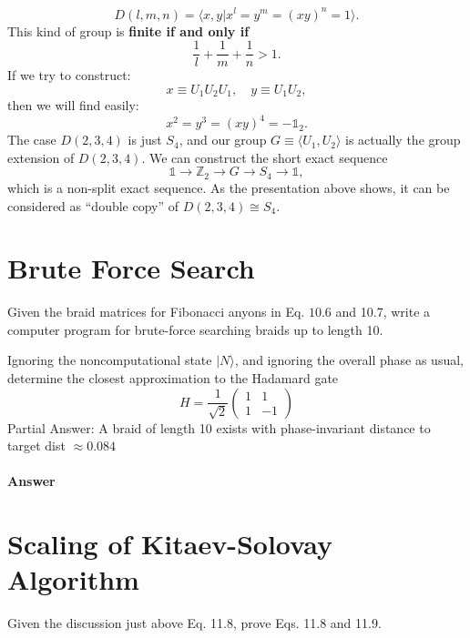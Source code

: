 \documentclass{book}
\begin{document}
\begin{equation*}
D( l,m,n) =\langle x,y|x^{l} =y^{m} =(xy )^{n} =1\rangle .
\end{equation*}
This kind of group is \textbf{finite if and only if}
\begin{equation*}
\frac{1}{l} +\frac{1}{m} +\frac{1}{n}  >1.
\end{equation*}
If we try to construct:
\begin{equation*}
x\equiv U_{1} U_{2} U_{1} ,\quad y\equiv U_{1} U_{2} ,
\end{equation*}
then we will find easily:
\begin{equation*}
x^{2} =y^{3} =( xy)^{4} =-\mathds{1}_{2} .
\end{equation*}
The case $D( 2,3,4)$ is just $S_{4}$, and our group $G\equiv \langle U_{1} ,U_{2} \rangle $ is actually the group extension of $D( 2,3,4)$. We can construct the short exact sequence
\begin{equation*}
\mathds{1}\rightarrow \mathbb{Z}_{2}\rightarrow G\rightarrow S_{4}\rightarrow \mathds{1} ,
\end{equation*}
which is a non-split exact sequence. As the presentation above shows, it can be considered as ``double copy'' of $D( 2,3,4) \cong S_{4}$. 

\section{Brute Force Search}
Given the braid matrices for Fibonacci anyons in Eq. $10.6$ and 10.7, write a computer program for brute-force searching braids up to length 10.



Ignoring the noncomputational state $|N\rangle $, and ignoring the overall phase as usual, determine the closest approximation to the Hadamard gate
\begin{equation*}
H=\frac{1}{\sqrt{2}}\begin{pmatrix}
1 & 1\\
1 & -1
\end{pmatrix}
\end{equation*}
Partial Answer: A braid of length 10 exists with phase-invariant distance to target dist $\approx 0.084$

\paragraph{Answer}

\section{Scaling of Kitaev-Solovay Algorithm}
Given the discussion just above Eq. 11.8, prove Eqs. 11.8 and 11.9.
\end{document}

